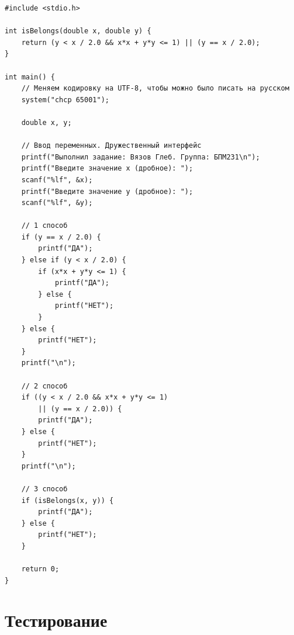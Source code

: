 \documentclass[12pt]{article}
\begin{document}
\begin{lstlisting}[label=string_code1,caption=C]
#include <stdio.h>

int isBelongs(double x, double y) {
    return (y < x / 2.0 && x*x + y*y <= 1) || (y == x / 2.0);
}

int main() {
    // Меняем кодировку на UTF-8, чтобы можно было писать на русском
    system("chcp 65001");

    double x, y;

    // Ввод переменных. Дружественный интерфейс
    printf("Выполнил задание: Вязов Глеб. Группа: БПМ231\n");
    printf("Введите значение x (дробное): ");
    scanf("%lf", &x);
    printf("Введите значение y (дробное): ");
    scanf("%lf", &y);

    // 1 способ
    if (y == x / 2.0) {
        printf("ДА");
    } else if (y < x / 2.0) {
        if (x*x + y*y <= 1) {
            printf("ДА");
        } else {
            printf("НЕТ");
        }
    } else {
        printf("НЕТ");
    }
    printf("\n");

    // 2 способ
    if ((y < x / 2.0 && x*x + y*y <= 1)
        || (y == x / 2.0)) {
        printf("ДА");
    } else {
        printf("НЕТ");
    }
    printf("\n");

    // 3 способ
    if (isBelongs(x, y)) {
        printf("ДА");
    } else {
        printf("НЕТ");
    }

    return 0;
}
\end{lstlisting} 

\newpage


\section*{Тестирование}
\end{document}
